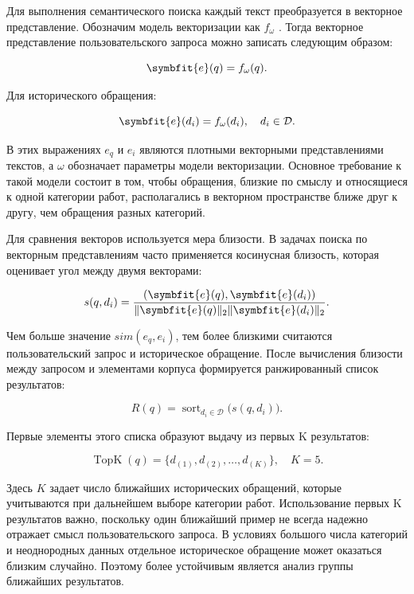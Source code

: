 \documentclass[14pt,a4paper]{extarticle}
\numberwithin{figure}{section}
\numberwithin{table}{section}
\begin{document}
Для выполнения семантического поиска каждый текст преобразуется в
векторное представление. Обозначим модель векторизации как
\(f_{\omega}\) . Тогда векторное представление пользовательского запроса можно
записать следующим образом:

\begin{equation}\symbfit{e}(q)=f_{\omega}(q).\label{eq:query-vector}\end{equation}

Для исторического обращения:

\begin{equation}\symbfit{e}(d_i)=f_{\omega}(d_i),\quad d_i\in\mathcal{D}.\label{eq:doc-vector}\end{equation}

В этих выражениях \(e_{q}\) и \(e_{i}\) являются плотными векторными
представлениями текстов, а \(\omega\) обозначает параметры модели
векторизации. Основное требование к такой модели состоит в том, чтобы
обращения, близкие по смыслу и относящиеся к одной категории работ,
располагались в векторном пространстве ближе друг к другу, чем обращения
разных категорий.

Для сравнения векторов используется мера близости. В задачах поиска по
векторным представлениям часто применяется косинусная близость, которая
оценивает угол между двумя векторами:

\begin{equation}s(q,d_i)=\frac{(\symbfit{e}(q),\symbfit{e}(d_i))}{\|\symbfit{e}(q)\|_2\|\symbfit{e}(d_i)\|_2}.\label{eq:cosine}\end{equation}

Чем больше значение \(sim\left( e_{q},e_{i} \right)\), тем более
близкими считаются пользовательский запрос и историческое обращение.
После вычисления близости между запросом и элементами корпуса
формируется ранжированный список результатов:

\begin{equation}R(q)=\operatorname{sort}_{d_i\in\mathcal{D}}\bigl(s(q,d_i)\bigr).\label{eq:ranking}\end{equation}

Первые элементы этого списка образуют выдачу из первых K результатов:

\begin{equation}\operatorname{TopK}(q)=\{d_{(1)},d_{(2)},\ldots,d_{(K)}\},\quad K=5.\end{equation}

Здесь \(K\) задает число ближайших исторических обращений, которые
учитываются при дальнейшем выборе категории работ. Использование первых K результатов
важно, поскольку один ближайший пример не всегда надежно отражает смысл
пользовательского запроса. В условиях большого числа категорий и
неоднородных данных отдельное историческое обращение может оказаться
близким случайно. Поэтому более устойчивым является анализ группы
ближайших результатов.
\end{document}
